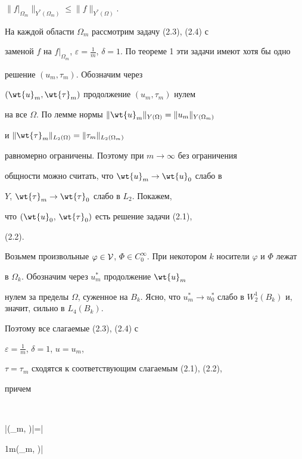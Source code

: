 $\|f|_{\Omega_m}\|_{Y^*(\Omega_m)}\leq\|f\|_{Y^*(\Omega)}$.





На каждой области $\Omega_m$ рассмотрим задачу (2.3), (2.4) с


заменой $f$ на $f|_{\Omega_m}$, $\varepsilon=\frac


{1}{m}$, $\delta{=}1$. По теореме 1 эти задачи имеют хотя бы одно


решение $(u_m, \tau_m)$. Обозначим через


$(\wt{u}_m,\wt{\tau}_m)$ продолжение $(u_m, \tau_m )$ нулем


на все $\Omega.$ По лемме нормы $\|\wt{u}_m\|_{Y


(\Omega)}=\|u_m\|_{Y(\Omega_m)}$


и $\|\wt{\tau}_m\|_{L_2(\Omega)}=\|\tau_m\|_{L_2  (\Omega_m)}$


равномерно ограничены. Поэтому при $m \to \infty $ без ограничения


общности  можно считать, что $\wt{u}_m\to\wt{u}_0$ слабо в


$Y$, $\wt{\tau}_m\to\wt{\tau}_0$ слабо в $L_2.$ Покажем,


что $(\wt{u}_0$, $\wt{\tau}_0)$ есть решение задачи (2.1),


(2.2).





Возьмем произвольные $\varphi\in\cal{V}$, $\Phi\in


C^{\infty}_0$. При некотором $k$ носители $\varphi$ и $\Phi$ лежат


в $\Omega_k$. Обозначим через $u^*_m$ продолжение $\wt {u}_m$


нулем за пределы $\Omega$, суженное на $B_k.$ Ясно, что $u_m^*\to


u_0^*$ слабо в $W^1_2(B_k)$ и, значит, сильно в $L_4(B_k)$.





Поэтому все слагаемые (2.3), (2.4) с


$\varepsilon=\frac {1}{m}$, $\delta = 1$, $u = u_m$,


$\tau = \tau_m$ сходятся к соответствующим слагаемым (2.1), (2.2),


причем


$$


|\varepsilon(\wt\nabla \tau_m, \wt\nabla\Phi)|=\bigg|\frac


{1}{m}(\wt{\tau}_m, \Delta \Phi)\bigg|\leq\frac


